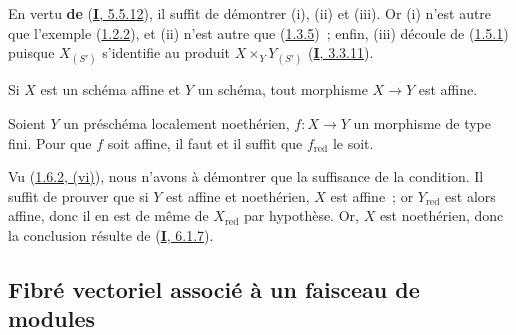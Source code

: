 En vertu \textbf{de} (\hyperref[I.5.5.12-fr]{\textbf{I}, 5.5.12}), il suffit de démontrer (i),
(ii) et (iii). Or (i) n'est autre que l'exemple
(\hyperref[II.1.2.2-fr]{1.2.2}), et (ii) n'est autre que
(\hyperref[II.1.3.5-fr]{1.3.5})~; enfin, (iii) découle de
(\hyperref[II.1.5.1-fr]{1.5.1}) puisque $X_{(S')}$ s'identifie au produit
$X\times_Y Y_{(S')}$ (\hyperref[I.3.3.11-fr]{\textbf{I}, 3.3.11}).

\begin{corollary}[1.6.3]
\label{II.1.6.3-fr}
Si $X$ est un schéma affine et $Y$ un schéma, tout morphisme $X\to Y$ est
affine.
\end{corollary}

\begin{proposition}[1.6.4]
\label{II.1.6.4-fr}
Soient $Y$ un préschéma localement noethérien, $f:X\to Y$ un morphisme de type
fini. Pour que $f$ soit affine, il faut et il suffit que $f_{\mathrm{red}}$ le
soit.
\end{proposition}

Vu (\hyperref[II.1.6.2-fr]{1.6.2, (vi)}), nous n'avons à démontrer que la
suffisance de la condition. Il suffit de prouver que si $Y$ est affine et
noethérien, $X$ est affine~; or $Y_{\mathrm{red}}$ est alors affine, donc il
en est de même de $X_{\mathrm{red}}$ par hypothèse. Or, $X$ est noethérien,
donc la conclusion résulte de (\hyperref[I.6.1.7-fr]{\textbf{I}, 6.1.7}).

\subsection{Fibré vectoriel associé à un faisceau de modules}
\label{II.1.7-fr}

